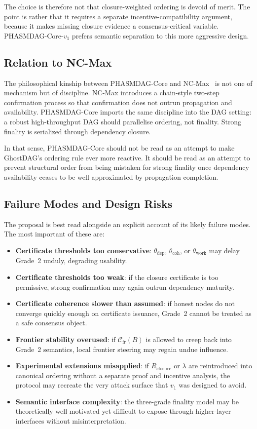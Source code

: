 \documentclass[11pt]{article}
\theoremstyle{definition}
\theoremstyle{plain}
\theoremstyle{remark}
\newcommand{\Cfr}{\mathcal{C}_{\mathrm{fr}}}
\newcommand{\Rcls}{R_{\mathrm{closure}}} %
\begin{document}
The choice is therefore not that closure-weighted ordering is devoid of merit.
The point is rather that it requires a separate incentive-compatibility
argument, because it makes missing closure evidence a consensus-critical
variable.
PHASMDAG-Core-$v_1$ prefers semantic separation to this more aggressive design.

\subsection{Relation to NC-Max}

The philosophical kinship between PHASMDAG-Core and NC-Max~\cite{zhang2022ncmax}
is not one of mechanism but of discipline.
NC-Max introduces a chain-style two-step confirmation process so that
confirmation does not outrun propagation and availability.
PHASMDAG-Core imports the same discipline into the DAG setting:
a robust high-throughput DAG should parallelise ordering, not finality.
Strong finality is serialized through dependency closure.

In that sense, PHASMDAG-Core should not be read as an attempt to make
GhostDAG's ordering rule ever more reactive.
It should be read as an attempt to prevent structural order from being
mistaken for strong finality once dependency availability ceases to be
well approximated by propagation completion.

\subsection{Failure Modes and Design Risks}

The proposal is best read alongside an explicit account of its likely failure
modes.  The most important of these are:
\begin{itemize}[nosep]
    \item \textbf{Certificate thresholds too conservative}: $\theta_{\mathrm{dep}}$,
    $\theta_{\mathrm{coh}}$, or $\theta_{\mathrm{work}}$ may delay Grade~2
    unduly, degrading usability.
    \item \textbf{Certificate thresholds too weak}: if the closure certificate is
    too permissive, strong confirmation may again outrun dependency maturity.
    \item \textbf{Certificate coherence slower than assumed}: if honest nodes do
    not converge quickly enough on certificate issuance, Grade~2 cannot be
    treated as a safe consensus object.
    \item \textbf{Frontier stability overused}: if $\Cfr(B)$ is allowed to creep
    back into Grade~2 semantics, local frontier steering may regain undue
    influence.
    \item \textbf{Experimental extensions misapplied}: if $\Rcls$ or $\lambda$
    are reintroduced into canonical ordering without a separate proof and
    incentive analysis, the protocol may recreate the very attack surface that
    $v_1$ was designed to avoid.
    \item \textbf{Semantic interface complexity}: the three-grade finality
    model may be theoretically well motivated yet difficult to expose through
    higher-layer interfaces without misinterpretation.
\end{itemize}
\end{document}
